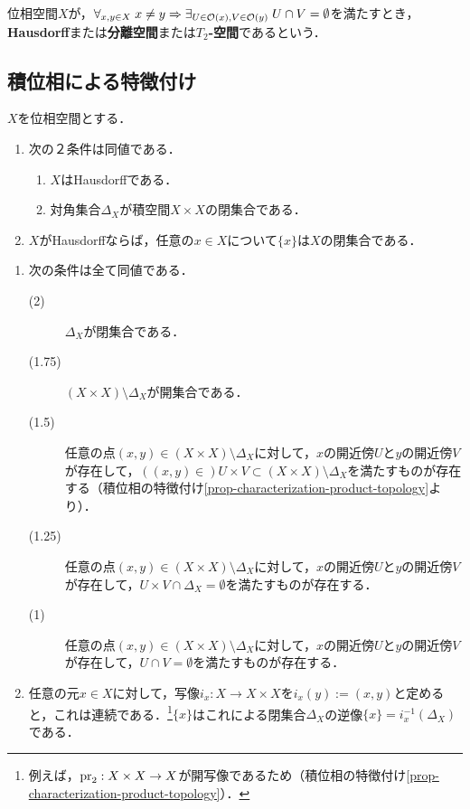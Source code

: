 \documentclass[uplatex,dvipdfmx]{jsreport}
\begin{document}
\begin{definition}
    位相空間$X$が，$\forall_{x,y\in X}\;x\ne y\Rightarrow\exists_{U\in\mathcal{O}(x),V\in\mathcal{O}(y)}\;U\cap V=\emptyset$を満たすとき，\textbf{Hausdorff}または\textbf{分離空間}または\textbf{$T_2$-空間}であるという．
\end{definition}

\subsection{積位相による特徴付け}

\begin{proposition}\label{prop-characterization-Hausdorff}
    $X$を位相空間とする．
    \begin{enumerate}
        \item 次の２条件は同値である．
        \begin{enumerate}[(1)]
            \item $X$はHausdorffである．
            \item 対角集合$\Delta_X$が積空間$X\times X$の閉集合である．
        \end{enumerate}
        \item $X$がHausdorffならば，任意の$x\in X$について$\{x\}$は$X$の閉集合である．
    \end{enumerate}
\end{proposition}
\begin{Proof}\mbox{}
    \begin{enumerate}
        \item 次の条件は全て同値である．
        \begin{description}
            \item[(2)] $\Delta_X$が閉集合である．
            \item[(1.75)] $(X\times X)\setminus\Delta_X$が開集合である．
            \item[(1.5)] 任意の点$(x,y)\in(X\times X)\setminus\Delta_X$に対して，$x$の開近傍$U$と$y$の開近傍$V$が存在して，$((x,y)\in )U\times V\subset (X\times X)\setminus\Delta_X$を満たすものが存在する（積位相の特徴付け\ref{prop-characterization-product-topology}より）．
            \item[(1.25)] 任意の点$(x,y)\in(X\times X)\setminus\Delta_X$に対して，$x$の開近傍$U$と$y$の開近傍$V$が存在して，$U\times V\cap\Delta_X=\emptyset$を満たすものが存在する．
            \item[(1)] 任意の点$(x,y)\in(X\times X)\setminus\Delta_X$に対して，$x$の開近傍$U$と$y$の開近傍$V$が存在して，$U\cap V=\emptyset$を満たすものが存在する．
        \end{description}
        \item 任意の元$x\in X$に対して，写像$i_x:X\to X\times X$を$i_x(y):=(x,y)$と定めると，これは連続である．\footnote{例えば，$\mathrm{pr}_2:X\times X\to X$が開写像であるため（積位相の特徴付け\ref{prop-characterization-product-topology}）．}$\{x\}$はこれによる閉集合$\Delta_X$の逆像$\{x\}=i^{-1}_x(\Delta_X)$である．
    \end{enumerate}
\end{Proof}
\end{document}
